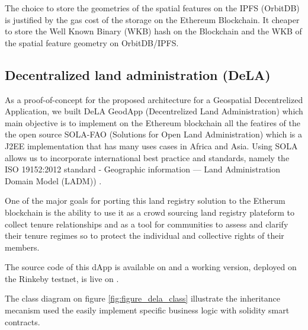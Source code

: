 \documentclass{isprs} %
\begin{document}
The choice to store the geometries of the spatial features on the IPFS (OrbitDB) is justified by the gas cost of the storage on the Ethereum Blockchain. It cheaper to store the Well Known Binary (WKB) hash on the Blockchain and the WKB of the spatial feature geometry on OrbitDB/IPFS.

\subsection{Decentralized land administration (DeLA)}\label{sec:Decentralized land administration (DeLA)}

As a proof-of-concept for the proposed architecture for a Geospatial Decentrelized Application, we built DeLA GeodApp (Decentrelized Land Administration) which main objective is to implement on the Ethereum blockchain all the featires of the the open source SOLA-FAO (Solutions for Open Land Administration) \cite{sola} which is a J2EE implementation that has many uses cases in Africa and Asia. Using SOLA allows us to incorporate international best practice and standards, namely the ISO 19152:2012 standard - Geographic information — Land Administration Domain Model (LADM)) \cite{van2013iso}.

One of the major goals for porting this land registry solution to the Etherum blockchain is the ability to use it as a crowd sourcing land registry plateform \cite{seufert2013fao} to collect tenure relationships and as a tool for communities to assess and clarify their tenure regimes so to protect the individual and collective rights of their members. 

The source code of this dApp is available on \cite{dela_live} and a working version, deployed on the Rinkeby testnet, is live on \cite{github_allilou_dela}.

The class diagram on figure \ref{fig:figure_dela_class} illustrate the inheritance mecanism used the easily implement specific business logic with solidity smart contracts.
\end{document}
